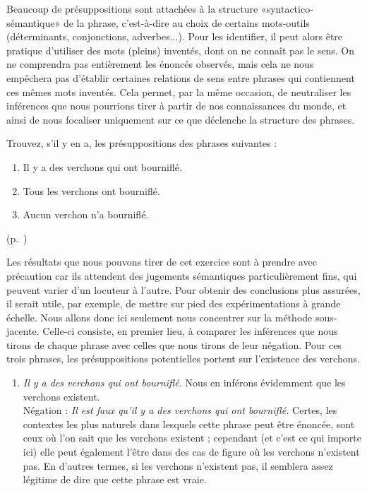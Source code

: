 \begin{exo}\label{exo:1psp2}\sloppy
Beaucoup de présuppositions sont attachées à la structure «syntactico-sémantique» de la phrase, c'est-à-dire au choix de certains mots-outils (déterminants, conjonctions, adverbes...). Pour les identifier, il peut alors être pratique d'utiliser des mots (pleins) inventés, dont on ne connaît pas le sens.  On ne comprendra pas entièrement les énoncés observés, mais cela ne nous empêchera pas d'établir certaines relations de sens entre phrases qui contiennent ces mêmes mots inventés. Cela permet, par la même occasion, de neutraliser les inférences que nous pourrions tirer à partir de nos connaissances du monde, et ainsi de nous focaliser uniquement sur ce que déclenche la structure des phrases.

\fussy

Trouvez, s'il y en a, les présuppositions des phrases suivantes :
\begin{enumerate}
\item Il y a des verchons qui ont bourniflé.
\item Tous les verchons ont bourniflé.
\item Aucun verchon n'a bourniflé.
\end{enumerate}
\begin{solu}
(p.~\pageref{exo:1psp2})

Les résultats que nous pouvons tirer de cet exercice sont à prendre avec précaution car ils attendent des jugements sémantiques particulièrement fins, qui peuvent varier d'un locuteur à l'autre. Pour obtenir des conclusions plus assurées, il serait utile, par exemple, de mettre sur pied des expérimentations à grande échelle.  Nous allons donc ici seulement nous concentrer sur la méthode sous-jacente.  Celle-ci consiste, en premier lieu, à comparer les inférences que nous tirons de chaque phrase avec celles que nous tirons de leur négation.  Pour ces trois phrases, les présuppositions potentielles portent sur l'existence des verchons.
\begin{enumerate}
\item \emph{Il y a des verchons qui ont bourniflé.} 
Nous en inférons évidemment que les verchons existent.\\
Négation : \emph{Il est faux qu'il y a des verchons qui ont bourniflé.}
Certes, les contextes les plus naturels dans lesquels cette phrase peut être énoncée, sont ceux où l'on sait que les verchons existent ; cependant (et c'est ce qui importe ici) elle peut également l'être dans des cas de figure où les verchons n'existent pas.  En d'autres termes, si les verchons n'existent pas, il semblera assez légitime de dire que cette phrase est vraie. 


\end{enumerate}
\end{solu}
\end{exo}
